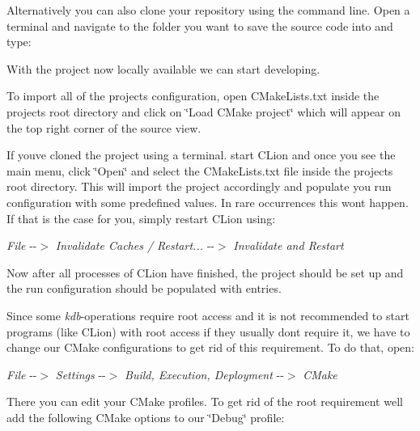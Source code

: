 Alternatively you can also clone your repository using the command line. Open a terminal and navigate to the folder you want to save the source code into and type\+:


\begin{DoxyCode}{0}
\end{DoxyCode}


With the project now locally available we can start developing.

To import all of the project\textquotesingle{}s configuration, open C\+Make\+Lists.\+txt inside the project\textquotesingle{}s root directory and click on \char`\"{}\+Load C\+Make project\char`\"{} which will appear on the top right corner of the source view.

If you\textquotesingle{}ve cloned the project using a terminal. start C\+Lion and once you see the main menu, click \char`\"{}\+Open\char`\"{} and select the C\+Make\+Lists.\+txt file inside the project\textquotesingle{}s root directory. This will import the project accordingly and populate you run configuration with some predefined values. In rare occurrences this won\textquotesingle{}t happen. If that is the case for you, simply restart C\+Lion using\+:

{\itshape File} -\/-\/$>$ {\itshape Invalidate Caches / Restart...} -\/-\/$>$ {\itshape Invalidate and Restart}

Now after all processes of C\+Lion have finished, the project should be set up and the run configuration should be populated with entries.

Since some {\itshape kdb}-\/operations require root access and it is not recommended to start programs (like C\+Lion) with root access if they usually don\textquotesingle{}t require it, we have to change our C\+Make configurations to get rid of this requirement. To do that, open\+:

{\itshape File} -\/-\/$>$ {\itshape Settings} -\/-\/$>$ {\itshape Build, Execution, Deployment} -\/-\/$>$ {\itshape C\+Make}

There you can edit your C\+Make profiles. To get rid of the root requirement we\textquotesingle{}ll add the following C\+Make options to our \char`\"{}\+Debug\char`\"{} profile\+:


\begin{DoxyCode}{0}
\end{DoxyCode}


